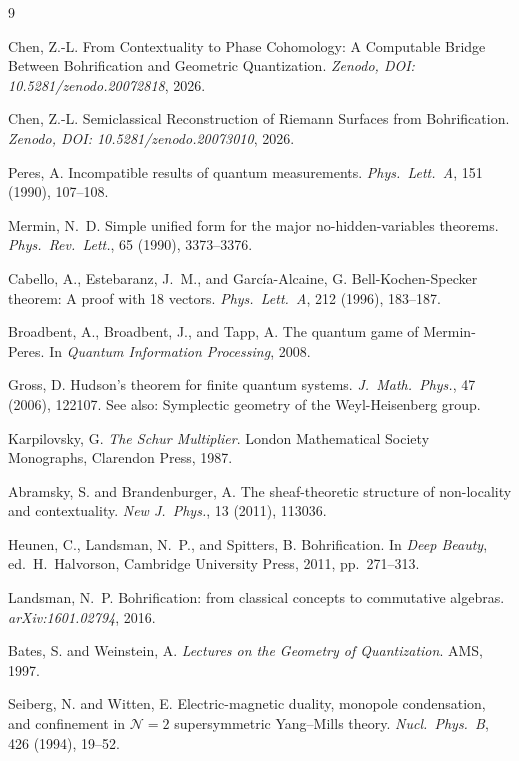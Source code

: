 \documentclass[11pt]{article}
\begin{document}
\begin{thebibliography}{9}

Chen, Z.-L.
From Contextuality to Phase Cohomology:
A Computable Bridge Between Bohrification and Geometric Quantization.
\textit{Zenodo, DOI: 10.5281/zenodo.20072818}, 2026.

Chen, Z.-L.
Semiclassical Reconstruction of Riemann Surfaces from Bohrification.
\textit{Zenodo, DOI: 10.5281/zenodo.20073010}, 2026.

Peres, A.
Incompatible results of quantum measurements.
\textit{Phys.\ Lett.\ A}, 151 (1990), 107--108.

Mermin, N.~D.
Simple unified form for the major no-hidden-variables theorems.
\textit{Phys.\ Rev.\ Lett.}, 65 (1990), 3373--3376.

Cabello, A., Estebaranz, J.~M., and Garc\'ia-Alcaine, G.
Bell-Kochen-Specker theorem: A proof with 18 vectors.
\textit{Phys.\ Lett.\ A}, 212 (1996), 183--187.

Broadbent, A., Broadbent, J., and Tapp, A.
The quantum game of Mermin-Peres.
In \textit{Quantum Information Processing}, 2008.

Gross, D.
Hudson's theorem for finite quantum systems.
\textit{J.\ Math.\ Phys.}, 47 (2006), 122107.
See also: Symplectic geometry of the Weyl-Heisenberg group.

Karpilovsky, G.
\textit{The Schur Multiplier}.
London Mathematical Society Monographs, Clarendon Press, 1987.

Abramsky, S. and Brandenburger, A.
The sheaf-theoretic structure of non-locality and contextuality.
\textit{New J.\ Phys.}, 13 (2011), 113036.

Heunen, C., Landsman, N.~P., and Spitters, B.
Bohrification.
In \textit{Deep Beauty}, ed.\ H.~Halvorson,
Cambridge University Press, 2011, pp.~271--313.

Landsman, N.~P.
Bohrification: from classical concepts to commutative algebras.
\textit{arXiv:1601.02794}, 2016.

Bates, S. and Weinstein, A.
\textit{Lectures on the Geometry of Quantization}.
AMS, 1997.

Seiberg, N. and Witten, E.
Electric-magnetic duality, monopole condensation, and confinement in
$\mathcal{N}=2$ supersymmetric Yang--Mills theory.
\textit{Nucl.\ Phys.\ B}, 426 (1994), 19--52.

\end{thebibliography}
\end{document}
